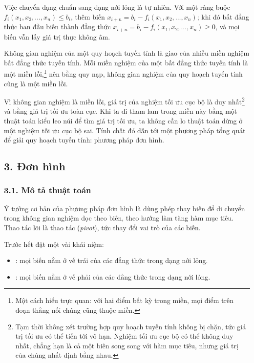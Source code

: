 \documentclass[11pt]{article}
\begin{document}
Việc chuyển dạng chuẩn sang dạng nới lỏng là tự nhiên. Với một ràng buộc
\(f_i(x_1,x_2,\ldots,x_n)\le b_i\), thêm biến
\(x_{i+n}=b_i-f_i(x_1,x_2,\ldots,x_n)\); khi đó bất đẳng thức ban đầu biến
thành đẳng thức \(x_{i+n}=b_i-f_i(x_1,x_2,\ldots,x_n)\ge 0\), và mọi biến
vẫn lấy giá trị thực không âm.

Không gian nghiệm của một quy hoạch tuyến tính là giao của nhiều miền nghiệm
bất đẳng thức tuyến tính. Mỗi miền nghiệm của một bất đẳng thức tuyến tính là
một miền lồi,\footnote{Một cách hiểu trực quan: với hai điểm bất kỳ trong
miền, mọi điểm trên đoạn thẳng nối chúng cũng thuộc miền.} nên bằng quy nạp,
không gian nghiệm của quy hoạch tuyến tính cũng là một miền lồi.

Vì không gian nghiệm là miền lồi, giá trị của nghiệm tối ưu cục bộ là duy
nhất\footnote{Tạm thời không xét trường hợp quy hoạch tuyến tính không bị
chặn, tức giá trị tối ưu có thể tiến tới vô hạn. Nghiệm tối ưu cục bộ có thể
không duy nhất, chẳng hạn là cả một biên song song với hàm mục tiêu, nhưng
giá trị của chúng nhất định bằng nhau.} và bằng giá trị tối ưu toàn cục. Khi
ta đi tham lam trong miền này bằng một thuật toán kiểu leo núi để tìm giá trị
tối ưu, ta không cần lo thuật toán dừng ở một nghiệm tối ưu cục bộ sai. Tính
chất đó dẫn tới một phương pháp tổng quát để giải quy hoạch tuyến tính:
phương pháp đơn hình.

\subsection*{3. Đơn hình}

\subsubsection*{3.1. Mô tả thuật toán}

Ý tưởng cơ bản của phương pháp đơn hình là dùng phép thay biến để di chuyển
trong không gian nghiệm dọc theo biên, theo hướng làm tăng hàm mục tiêu. Thao
tác lõi là thao tác  (\emph{pivot}), tức thay đổi vai trò của
các biến.

Trước hết đặt một vài khái niệm:
\begin{itemize}
  \item {}: mọi biến nằm ở vế trái của các đẳng thức trong
  dạng nới lỏng.
  \item {}: mọi biến nằm ở vế phải của các đẳng thức trong
  dạng nới lỏng.
\end{itemize}
\end{document}
